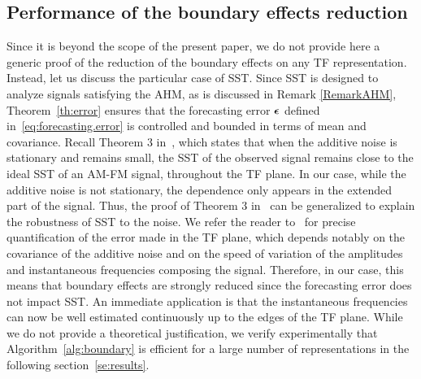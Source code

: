 \subsection{Performance of the boundary effects reduction}
\label{sse:perf.BoundEffRed}
Since it is beyond the scope of the present paper, we do not provide here a generic proof of the reduction of the boundary effects on any TF representation. Instead, let us discuss the particular case of SST. Since SST is designed to analyze signals satisfying the AHM, as is discussed in Remark \ref{RemarkAHM}, Theorem~\ref{th:error} ensures that the forecasting error $\boldsymbol{\epsilon}$ defined in~\eqref{eq:forecasting.error} is controlled and bounded in terms of mean and covariance. Recall Theorem 3 in~\cite{Chen14nonparametric}, which states that when the additive noise is stationary and remains small, the SST of the observed signal remains close to the ideal SST of an AM-FM signal, throughout the TF plane. In our case, while the additive noise is not stationary, the dependence only appears in the extended part of the signal. Thus, the proof of Theorem 3 in~\cite{Chen14nonparametric} can be generalized to explain the robustness of SST to the noise. We refer the reader to~\cite{Chen14nonparametric} for precise quantification of the error made in the TF plane, which depends notably on the covariance of the additive noise and on the speed of variation of the amplitudes and instantaneous frequencies composing the signal. Therefore, in our case, this means that boundary effects are strongly reduced since the forecasting error does not impact SST. An immediate application is that the instantaneous frequencies can now be well estimated continuously up to the edges of the TF plane.
While we do not provide a theoretical justification, we verify experimentally that Algorithm~\ref{alg:boundary} is efficient for a large number of representations in the following section~\ref{se:results}.